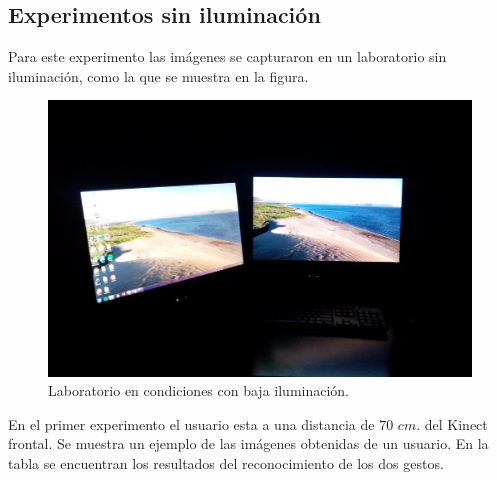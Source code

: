 

\subsection{Experimentos sin iluminación}
Para este experimento las imágenes se capturaron en un laboratorio sin iluminación, como la que se muestra en la figura.

\begin{figure}[h!]
\begin{center} 
\includegraphics[scale=0.09]{./Figures/noIluminacion.jpg}
\end{center}
\caption{Laboratorio en condiciones con baja iluminación.}
\label{fig:LabNoIluminado} 
\end{figure} 

En el primer experimento el usuario esta a una distancia de $70$ $cm.$ del Kinect frontal. Se muestra un ejemplo de las imágenes obtenidas de un usuario. En la tabla se encuentran los resultados del reconocimiento de los dos gestos.  

